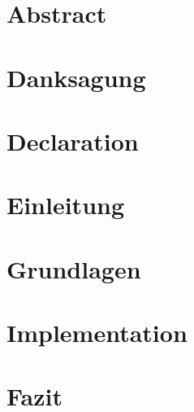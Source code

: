 \documentclass[12pt, twoside]{report}
\begin{document}



\chapter*{Abstract}
\label{sec:abs}
\lorem



\chapter*{Danksagung}
\label{sec:dank}
\lorem

\chapter*{Declaration}
\lorem

\tableofcontents

\chapter{Einleitung}


\chapter{Grundlagen}


\chapter{Implementation}


\chapter{Fazit}

\end{document}

